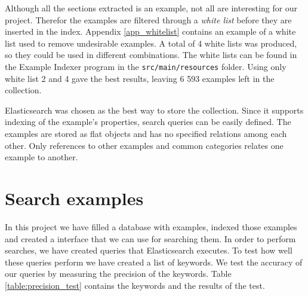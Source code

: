 Although all the sections extracted is an example, not all are interesting for our project. Therefor the examples are filtered through a \textit{white list} before they are inserted in the index. Appendix \ref{app_whitelist} contains an example of a white list used to remove undesirable examples. A total of 4 white lists was produced, so they could be used in different combinations. The white lists can be found in the Example Indexer program in the \texttt{src/main/resources} folder.
Using only white list 2 and 4 gave the best results, leaving 6 593 examples left in the collection.

Elasticsearch was chosen as the best way to store the collection. Since it supports indexing of the example's properties, search queries can be easily defined. The examples are stored as flat objects and has no specified relations among each other. Only references to other examples and common categories relates one example to another.


\section{Search examples}
In this project we have filled a database with examples, indexed those examples and created a interface that we can use for searching them. In order to perform searches, we have created queries that Elasticsearch executes. To test how well these queries perform we have created a list of keywords. We test the accuracy of our queries by measuring the precision of the keywords. Table \ref{table:precision_test} contains the keywords and the results of the test.

